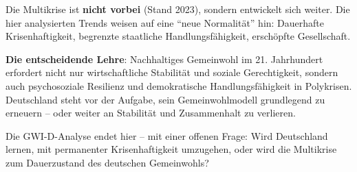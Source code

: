 Die Multikrise ist \textbf{nicht vorbei} (Stand 2023), sondern entwickelt sich weiter. Die hier analysierten Trends weisen auf eine \enquote{neue Normalität} hin: Dauerhafte Krisenhaftigkeit, begrenzte staatliche Handlungsfähigkeit, erschöpfte Gesellschaft.

\textbf{Die entscheidende Lehre}: Nachhaltiges Gemeinwohl im 21. Jahrhundert erfordert nicht nur wirtschaftliche Stabilität und soziale Gerechtigkeit, sondern auch psychosoziale Resilienz und demokratische Handlungsfähigkeit in Polykrisen. Deutschland steht vor der Aufgabe, sein Gemeinwohlmodell grundlegend zu erneuern – oder weiter an Stabilität und Zusammenhalt zu verlieren.

Die GWI-D-Analyse endet hier – mit einer offenen Frage: Wird Deutschland lernen, mit permanenter Krisenhaftigkeit umzugehen, oder wird die Multikrise zum Dauerzustand des deutschen Gemeinwohls?

\endinput